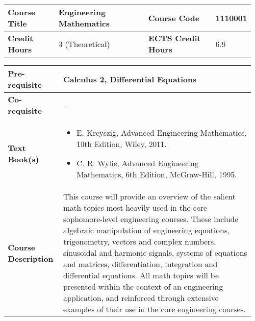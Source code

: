 \documentclass[12pt]{article}
\begin{document}
\begin{minipage}{\textwidth}
\begin{tabularx}{\textwidth}{|l|X|l|X|}
\hline
\textbf{Course Title}       &   Engineering Mathematics & \textbf{Course Code}       & 1110001  \\ \hline
\textbf{Credit Hours}       &  3 (Theoretical) & \textbf{ECTS Credit Hours}       &  6.9  \\ \hline
\end{tabularx}

\begin{tabularx}{\textwidth}{|l|X|}
\hline
\textbf{Pre-requisite}      &   Calculus 2, Differential Equations \\ \hline
\textbf{Co-requisite}       &  -- \\ \hline
\textbf{Text Book(s)}      & \begin{minipage}{.70\textwidth}
					\begin{itemize} \itemsep-0.4em
						\vspace{3mm}
						\item E. Kreyszig, Advanced Engineering Mathematics, 10th Edition, Wiley, 2011.
						\item C. R. Wylie, Advanced Engineering Mathematics, 6th Edition, McGraw-Hill, 1995.
						\vspace{3mm}
					\end{itemize}
				\end{minipage}  \\ \hline
\textbf{Course Description} & \begin{minipage}{.70\textwidth}
					\vspace{3mm}
					This course will provide an overview of the salient math topics most heavily used
					in the core sophomore-level engineering courses. These include algebraic manipulation of
					engineering equations, trigonometry, vectors and complex numbers, sinusoidal and harmonic
					signals, systems of equations and matrices, differentiation, integration and differential equations.
					All math topics will be presented within the context of an engineering application, and reinforced
					through extensive examples of their use in the core engineering courses.

					\vspace{3mm}
					\end{minipage} \\ \hline
\end{tabularx}
\end{minipage}
\end{document}
